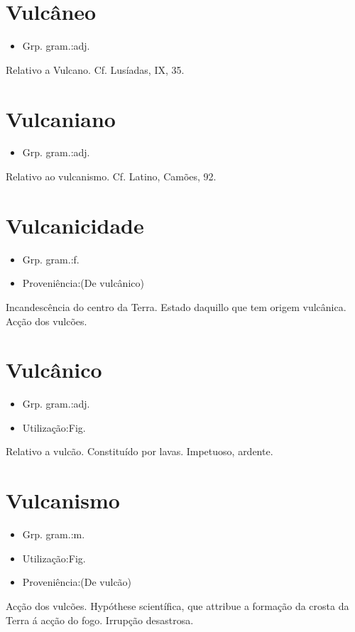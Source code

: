 \documentclass{article}
\begin{document}
\section{Vulcâneo}
\begin{itemize}
\item {Grp. gram.:adj.}
\end{itemize}
Relativo a Vulcano. Cf. \textunderscore Lusíadas\textunderscore , IX, 35.
\section{Vulcaniano}
\begin{itemize}
\item {Grp. gram.:adj.}
\end{itemize}
Relativo ao vulcanismo. Cf. Latino, \textunderscore Camões\textunderscore , 92.
\section{Vulcanicidade}
\begin{itemize}
\item {Grp. gram.:f.}
\end{itemize}
\begin{itemize}
\item {Proveniência:(De \textunderscore vulcânico\textunderscore )}
\end{itemize}
Incandescência do centro da Terra.
Estado daquillo que tem origem vulcânica.
Acção dos vulcões.
\section{Vulcânico}
\begin{itemize}
\item {Grp. gram.:adj.}
\end{itemize}
\begin{itemize}
\item {Utilização:Fig.}
\end{itemize}
Relativo a vulcão.
Constituído por lavas.
Impetuoso, ardente.
\section{Vulcanismo}
\begin{itemize}
\item {Grp. gram.:m.}
\end{itemize}
\begin{itemize}
\item {Utilização:Fig.}
\end{itemize}
\begin{itemize}
\item {Proveniência:(De \textunderscore vulcão\textunderscore )}
\end{itemize}
Acção dos vulcões.
Hypóthese scientífica, que attribue a formação da crosta da Terra á acção do fogo.
Irrupção desastrosa.
\end{document}
